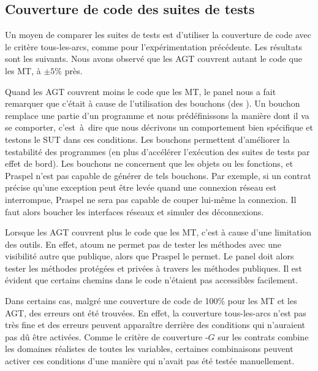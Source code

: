 
\subsection{Couverture de code des suites de tests}
\label{subsection:experimentation:coverage}


Un moyen de comparer les suites de tests est d'utiliser la couverture de code
avec le critère tous-les-arcs, comme pour l'expérimentation précédente.  Les
résultats sont les suivants. Nous avons observé que les AGT couvrent autant le
code que les MT, à $\pm 5\%$ près.

Quand les AGT couvrent moins le code que les MT, le panel nous a fait remarquer
que c'était à cause de l'utilisation des bouchons (des ). Un
bouchon remplace une partie d'un programme et nous prédéfinissons la manière
dont il va se comporter, c'est~à~dire que nous décrivons un comportement bien
spécifique et testons le SUT dans ces conditions.  Les bouchons permettent
d'améliorer la testabilité des programmes (en plus d'accélérer l'exécution des
suites de tests par effet de bord). Les bouchons ne concernent que les objets ou
les fonctions, et Praspel n'est pas capable de générer de tels bouchons. Par
exemple, si un contrat précise qu'une exception peut être levée quand une
connexion réseau est interrompue, Praspel ne sera pas capable de couper lui-même
la connexion. Il faut alors boucher les interfaces réseaux et simuler des
déconnexions.

Lorsque les AGT couvrent plus le code que les MT, c'est à cause d'une limitation
des outils. En effet, atoum ne permet pas de tester les méthodes avec une
visibilité autre que publique, alors que Praspel le permet. Le panel doit alors
tester les méthodes protégées et privées à travers les méthodes publiques. Il
est évident que certains chemins dans le code n'étaient pas accessibles
facilement.

Dans certains cas, malgré une couverture de code de 100\% pour les MT et les
AGT, des erreurs ont été trouvées. En effet, la couverture tous-les-arcs n'est
pas très fine et des erreurs peuvent apparaître derrière des conditions qui
n'auraient pas dû être activées. Comme le critère de couverture
-$G$ sur les contrats combine les domaines réalistes de toutes
les variables, certaines combinaisons peuvent activer ces conditions d'une
manière qui n'avait pas été testée manuellement.

